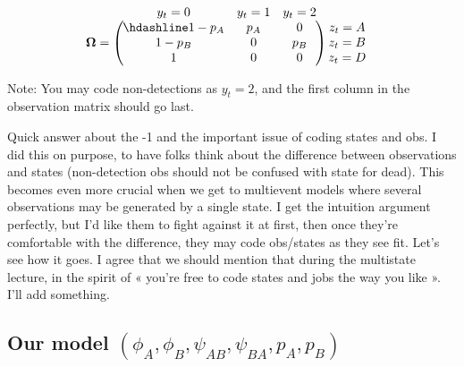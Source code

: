 \documentclass[
  12pt,
]{krantz}
\begin{document}
\[
\begin{matrix}
& \\
\mathbf{\Omega} =
    \left ( \vphantom{ \begin{matrix} 12 \\ 12 \\ 12 \end{matrix} } \right .
\end{matrix}
\hspace{-1.2em}
\begin{matrix}
    y_t=0 & y_t=1 & y_t=2 \\ \hdashline
1 - p_A & p_A & 0\\
1 - p_B & 0 & p_B\\
1 & 0 & 0
\end{matrix}
\hspace{-0.2em}
\begin{matrix}
& \\
\left . \vphantom{ \begin{matrix} 12 \\ 12 \\ 12 \end{matrix} } \right )
    \begin{matrix}
    z_{t}=A \\ z_{t}=B \\ z_{t}=D
    \end{matrix}
\end{matrix}
\]

Note: You may code non-detections as \(y_t = 2\), and the first column in the observation matrix should go last.

Quick answer about the -1 and the important issue of coding states and obs. I did this on purpose, to have folks think about the difference between observations and states (non-detection obs should not be confused with state for dead). This becomes even more crucial when we get to multievent models where several observations may be generated by a single state. I get the intuition argument perfectly, but I'd like them to fight against it at first, then once they're comfortable with the difference, they may code obs/states as they see fit. Let's see how it goes. I agree that we should mention that during the multistate lecture, in the spirit of « you're free to code states and jobs the way you like ». I'll add something.

\hypertarget{our-model-phi_a-phi_b-psi_ab-psi_ba-p_a-p_b}{%
\subsection{\texorpdfstring{Our model \((\phi_A, \phi_B, \psi_{AB}, \psi_{BA}, p_A, p_B)\)}{Our model (\textbackslash phi\_A, \textbackslash phi\_B, \textbackslash psi\_\{AB\}, \textbackslash psi\_\{BA\}, p\_A, p\_B)}}\label{our-model-phi_a-phi_b-psi_ab-psi_ba-p_a-p_b}}
\end{document}
